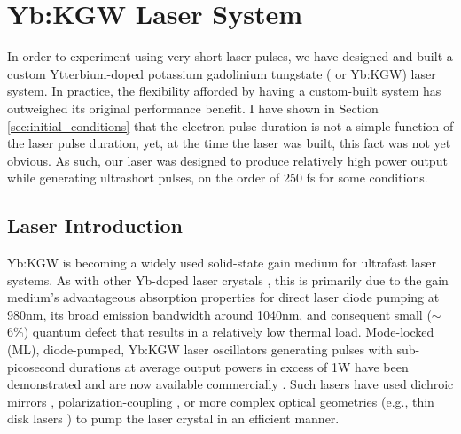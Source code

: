 
\section{Yb:KGW Laser System} \label{sec:laser}


In order to experiment using very short laser pulses, we have designed and built a custom Ytterbium-doped potassium gadolinium tungstate ( or Yb:KGW) laser system.\cite{berger_high-power_2008}
In practice, the flexibility afforded by having a custom-built system has outweighed its original performance benefit.
I have shown in Section \ref{sec:initial_conditions} that the electron pulse duration is not a simple function of the laser pulse duration, yet, at the time the laser was built, this fact was not yet obvious.
As such, our laser was designed to produce relatively high power output while generating ultrashort pulses, on the order of 250 fs for some conditions.

\subsection{Laser Introduction}
Yb:KGW is becoming a widely used solid-state gain medium for ultrafast laser systems.
As with other Yb-doped laser crystals \cite{Brenier_new_criteria}, this is primarily due to the gain medium's advantageous absorption properties for direct laser diode pumping at 980nm, its broad emission bandwidth around 1040nm, and consequent small ($\sim$ 6\%) quantum defect that results in a relatively low thermal load. 
Mode-locked (ML), diode-pumped, Yb:KGW laser oscillators generating pulses with sub-picosecond durations at average output powers in excess of 1W have been demonstrated \cite{Brunner_diode_pumped,Courjaud_high_power,Major_femtosecond_2006,Holtom_mode_locked_2006} and are now available commercially \cite{website_amplitude,website_solar}.
Such lasers have used dichroic mirrors \cite{Brunner_diode_pumped,Major_femtosecond_2006,Paunescu_diode_2004,Major_extended_2006}, polarization-coupling \cite{Holtom_mode_locked_2006}, or more complex optical geometries (e.g., thin disk lasers \cite{website_amplitude,Brunner_pulses_2002}) to pump the laser crystal in an efficient manner.

